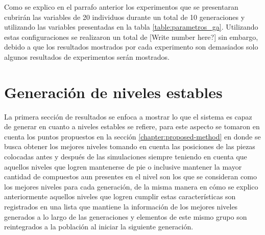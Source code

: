 Como se explico en el parrafo anterior los experimentos que se presentaran
cubrirán las variables de 20 individuos durante un total de 10 generaciones y
utilizando las variables presentadas en la tabla \ref{table:parametros_ga}.
Utilizando estas configuraciones se realizaron un total de [Write number here?]
sin embargo, debido a que los resultados mostrados por cada experimento son
demasiados solo algunos resultados de experimentos serán mostrados.

\section{Generación de niveles estables}
\label{section:chap6_stable_level_generation}

La primera sección de resultados se enfoca a mostrar lo que el sistema es capaz
de generar en cuanto a niveles estables se refiere, para este aspecto se tomaron
en cuenta los puntos propuestos en la sección \ref{chapter:proposed-method} en
donde se busca obtener los mejores niveles tomando en cuenta las posiciones de
las piezas colocadas antes y después de las simulaciones siempre teniendo en
cuenta que aquellos niveles que logren mantenerse de pie o inclusive mantener la
mayor cantidad de compuestos aun presentes en el nivel son los que se consideran
como los mejores niveles para cada generación, de la misma manera en cómo se
explico anteriormente aquellos niveles que logren cumplir estas características
son registrados en una lista que mantiene la información de los mejores niveles
generados a lo largo de las generaciones y elementos de este mismo grupo son
reintegrados a la población al iniciar la siguiente generación.

